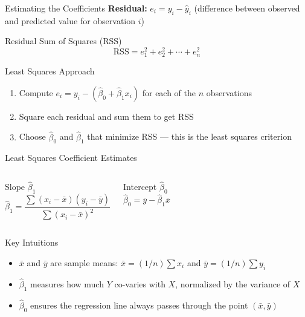 \documentclass[ignorenonframetext,]{beamer}
\begin{document}
\begin{frame}{Estimating the Coefficients}
\textbf{Residual:} $e_i = y_i - \hat{y}_i$ (difference between observed and predicted value for observation $i$)

\begin{alertblock}{Residual Sum of Squares (RSS)}
$$\mathrm{RSS} = e_1^2 + e_2^2 + \cdots + e_n^2$$
\end{alertblock}

\begin{block}{Least Squares Approach}
\begin{enumerate}
\item Compute $e_i = y_i - (\hat\beta_0 + \hat\beta_1 x_i)$ for each of the $n$ observations
\item Square each residual and sum them to get RSS
\item Choose $\hat\beta_0$ and $\hat\beta_1$ that minimize RSS --- this is the least squares criterion
\end{enumerate}
\end{block}
\end{frame}

\begin{frame}{Least Squares Coefficient Estimates}
\begin{columns}[T]
\begin{block}{Slope $\hat\beta_1$}
$$\hat\beta_1 = \frac{\sum (x_i - \bar{x})(y_i - \bar{y})}{\sum (x_i - \bar{x})^2}$$
\end{block}
\begin{block}{Intercept $\hat\beta_0$}
$$\hat\beta_0 = \bar{y} - \hat\beta_1 \bar{x}$$
\end{block}
\end{columns}

\begin{block}{Key Intuitions}
\begin{itemize}
\item $\bar{x}$ and $\bar{y}$ are sample means: $\bar{x} = (1/n)\sum x_i$ and $\bar{y} = (1/n)\sum y_i$
\item $\hat\beta_1$ measures how much $Y$ co-varies with $X$, normalized by the variance of $X$
\item $\hat\beta_0$ ensures the regression line always passes through the point $(\bar{x}, \bar{y})$
\end{itemize}
\end{block}
\end{frame}
\end{document}

